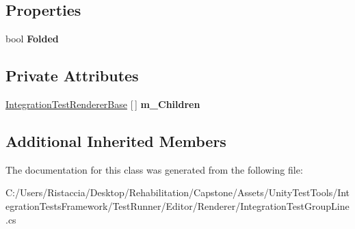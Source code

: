 \subsection*{Properties}
\begin{DoxyCompactItemize}
\item 
\mbox{\label{class_unity_test_1_1_integration_test_group_line_aea9e47f7d7f6c59187a202361401c942}} 
bool {\bfseries Folded}
\end{DoxyCompactItemize}
\subsection*{Private Attributes}
\begin{DoxyCompactItemize}
\item 
\mbox{\label{class_unity_test_1_1_integration_test_group_line_acfba82e2cbad49e06b630b408b3d2e37}} 
\hyperlink{class_unity_test_1_1_integration_test_renderer_base}{Integration\+Test\+Renderer\+Base} \mbox{[}$\,$\mbox{]} {\bfseries m\+\_\+\+Children}
\end{DoxyCompactItemize}
\subsection*{Additional Inherited Members}


The documentation for this class was generated from the following file\+:\begin{DoxyCompactItemize}
\item 
C\+:/\+Users/\+Ristaccia/\+Desktop/\+Rehabilitation/\+Capstone/\+Assets/\+Unity\+Test\+Tools/\+Integration\+Tests\+Framework/\+Test\+Runner/\+Editor/\+Renderer/Integration\+Test\+Group\+Line.\+cs\end{DoxyCompactItemize}
